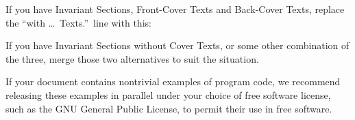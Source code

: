 \begin{scriptsize}
\begin{multicols}{2}
    If you have Invariant Sections, Front-Cover Texts and Back-Cover Texts, replace the ``with \dots\ Texts.''\ line with this:

    
    If you have Invariant Sections without Cover Texts, or some other combination of the three, merge those two alternatives to suit the situation.

    If your document contains nontrivial examples of program code, we recommend releasing these examples in parallel under your choice of free software license, such as the GNU General Public License, to permit their use in free software.

\end{multicols}
\end{scriptsize}

